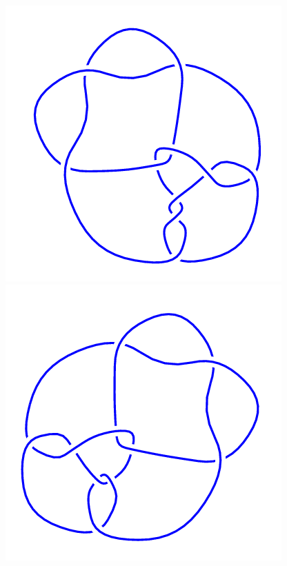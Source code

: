 \begin{figure}[H]
	\begin{minipage}[b]{.18\linewidth}
		\centering
		\includegraphics[width=\linewidth]{../data/10_152.png}
	\end{minipage}
	\begin{minipage}[b]{.18\linewidth}
		\centering
		\includegraphics[width=\linewidth]{../data/10_153.png}

\end{minipage}
\end{figure}
